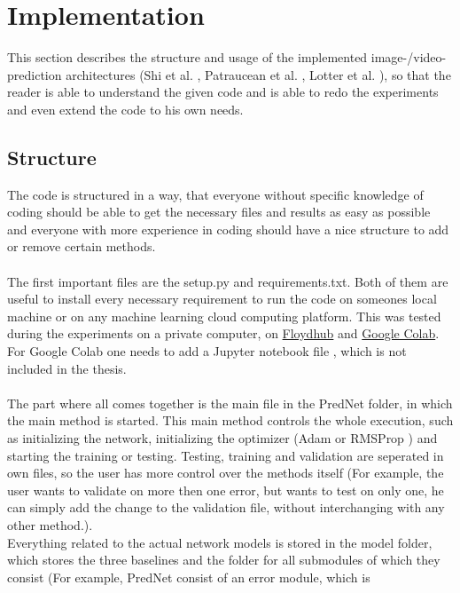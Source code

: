 \section{Implementation} \label{section::implementation}
 This section describes the structure and usage of the implemented image-/video-prediction architectures (Shi et al. \cite{Shi2015}, Patraucean et al. 
 \cite{Patraucean2015}, Lotter et al. \cite{Lotter2016}), so that the reader is able to understand the given code and is able to redo the experiments and even 
 extend the code to his own needs.
  
 \subsection{Structure} \label{subsection::structure}
  The code is structured in a way, that everyone without specific knowledge of coding should be able to get the necessary files and results as easy as possible 
  and everyone with more experience in coding should have a nice structure to add or remove certain methods.
  \\\\
  The first important files are the setup.py and requirements.txt. Both of them are useful to install every necessary requirement to run the code on someones 
  local machine or on any machine learning cloud computing platform. This was tested during the experiments on a private computer, on 
  \href{www.floydhub.com} {Floydhub} and \href{colab.research.google.com}{Google Colab}.
  For Google Colab one needs to add a Jupyter notebook file \cite{Kluyver2016}, which is not included in the thesis.
  \\\\
  The part where all comes together is the main file in the PredNet folder, in which the main method is started. This main method controls the whole
  execution, such as initializing the network,
  initializing the optimizer (Adam \cite{Kingma2015} or RMSProp \cite{Ruder2016}) and starting the training or testing. Testing, training and validation 
  are seperated in own files, so the user has more 
  control over the methods itself (For example, the user wants to validate on more then one error, but wants to test on only one, he can simply
  add the change to the validation file, without interchanging with any other method.).
  \\
  Everything related to the actual network models is stored in the model 
  folder, which stores the three baselines and the folder for all submodules of which they consist (For example, PredNet consist of an error module, which is 
